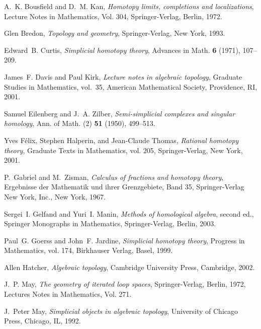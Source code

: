 \documentclass[12pt]{article}
\theoremstyle{plain}
\theoremstyle{definition}
\begin{document}
 
\providecommand{\bysame}{\leavevmode\hbox to3em{\hrulefill}\thinspace}
\providecommand{\MR}{\relax\ifhmode\unskip\space\fi MR }
\providecommand{\MRhref}[2]{%
  \href{http://www.ams.org/mathscinet-getitem?mr=#1}{#2}
}
\providecommand{\href}[2]{#2}
\begin{thebibliography}{10}

A.~K. Bousfield and D.~M. Kan, \emph{Homotopy limits, completions and
  localizations}, Lecture Notes in Mathematics, Vol. 304, Springer-Verlag,
  Berlin, 1972.

Glen Bredon, \emph{Topology and geometry}, Springer-Verlag, New York, 1993.

Edward~B. Curtis, \emph{Simplicial homotopy theory}, Advances in Math.
  \textbf{6} (1971), 107--209.

James~F. Davis and Paul Kirk, \emph{Lecture notes in algebraic topology},
  Graduate Studies in Mathematics, vol.~35, American Mathematical Society,
  Providence, RI, 2001.

Samuel Eilenberg and J.~A. Zilber, \emph{Semi-simplicial complexes and singular
  homology}, Ann. of Math. (2) \textbf{51} (1950), 499--513.

Yves F{\'e}lix, Stephen Halperin, and Jean-Claude Thomas, \emph{Rational
  homotopy theory}, Graduate Texts in Mathematics, vol. 205, Springer-Verlag,
  New York, 2001.

P.~Gabriel and M.~Zisman, \emph{Calculus of fractions and homotopy theory},
  Ergebnisse der Mathematik und ihrer Grenzgebiete, Band 35, Springer-Verlag
  New York, Inc., New York, 1967.

Sergei~I. Gelfand and Yuri~I. Manin, \emph{Methods of homological algebra},
  second ed., Springer Monographs in Mathematics, Springer-Verlag, Berlin,
  2003.

Paul~G. Goerss and John~F. Jardine, \emph{Simplicial homotopy theory}, Progress
  in Mathematics, vol. 174, Birkhauser Verlag, Basel, 1999.

Allen Hatcher, \emph{Algebraic topology}, Cambridge University Press,
  Cambridge, 2002.

J.~P. May, \emph{The geometry of iterated loop spaces}, Springer-Verlag,
  Berlin, 1972, Lectures Notes in Mathematics, Vol. 271.

J.~Peter May, \emph{Simplicial objects in algebraic topology}, University of
  Chicago Press, Chicago, IL, 1992.


\end{thebibliography}
\end{document}
